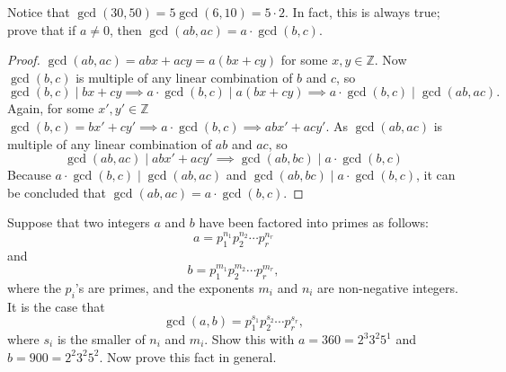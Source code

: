 \documentclass[12pt]{article}
\newenvironment{exercise}[2][Exercise]{\begin{trivlist}
\item[\hskip \labelsep {\bfseries #1}\hskip \labelsep {\bfseries #2.}]}{\end{trivlist}}
\begin{document}
\begin{exercise}{9}
	Notice that \(\gcd(30, 50) = 5 \gcd(6, 10) = 5 \cdot 2\). In fact, this is always true; prove that if \(a \neq 0\), then \(\gcd(ab, ac) = a \cdot \gcd(b, c)\).
\end{exercise}

\begin{proof}
	$\gcd(ab,ac)= abx+acy = a(bx+cy)$ for some $x, y\in \mathbb{Z}$. Now $\gcd(b,c)$ is multiple of any linear combination of $b$ and $c$, so
	$$
		\gcd(b,c) \mid bx + cy \implies a\cdot \gcd(b,c) \mid a(bx+cy) \implies a\cdot \gcd(b,c) \mid \gcd(ab,ac).
	$$
	Again, for some $x', y' \in \mathbb{Z}$  $\gcd(b,c) = bx'+cy' \implies a \cdot \gcd(b,c) \implies abx'+acy'$. As $\gcd(ab,ac)$ is multiple of any linear combination of $ab$ and $ac$, so
	\[
		\gcd(ab,ac) \mid abx'+acy' \implies \gcd(ab,bc) \mid a\cdot \gcd(b,c)
	\]
	Because $a\cdot \gcd(b,c) \mid \gcd(ab,ac)$ and $\gcd(ab,bc) \mid a\cdot \gcd(b,c)$, it can be concluded that $\gcd(ab,ac)=a\cdot \gcd(b,c)$.
\end{proof}

\begin{exercise}{10}
	Suppose that two integers \(a\) and \(b\) have been factored into primes as follows:
	\[
		a = p_1^{n_1} p_2^{n_2} \cdots p_r^{n_r}
	\]
	and
	\[
		b = p_1^{m_1} p_2^{m_2} \cdots p_r^{m_r},
	\]
	where the \(p_i\)'s are primes, and the exponents \(m_i\) and \(n_i\) are non-negative integers. It is the case that
	\[
		\gcd(a, b) = p_1^{s_1} p_2^{s_2} \cdots p_r^{s_r},
	\]
	where \(s_i\) is the smaller of \(n_i\) and \(m_i\). Show this with \(a = 360 = 2^3 3^2 5^1\) and \(b = 900 = 2^2 3^2 5^2\). Now prove this fact in general.
\end{exercise}
\end{document}

